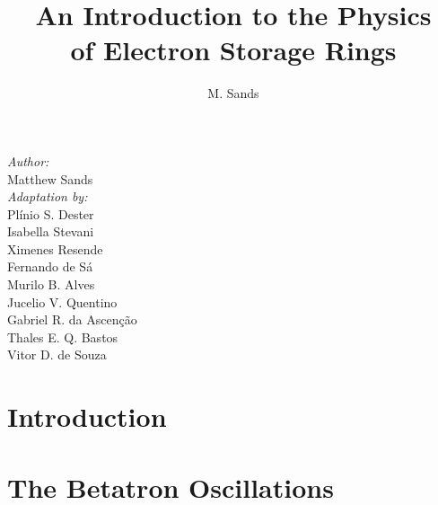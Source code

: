 \documentclass[ebook,a4paper,12pt,oneside,openany]{memoir}
\title{An Introduction to the Physics\\ of Electron Storage Rings}
\author{M. Sands}
\numberwithin{equation}{chapter}
\begin{document}
\maketitle
\vspace{30mm}
\begin{flushright}
    \textit{Author:} \\
    \vspace{1mm}
        Matthew Sands \\
    \vspace{5mm}
    \textit{Adaptation by:} \\
    \vspace{1mm}
	Pl\'inio S. Dester \\
	Isabella Stevani \\
	Ximenes Resende \\
  Fernando de S\'a \\
  Murilo B. Alves \\
    Jucelio V. Quentino \\
    Gabriel R. da Ascenção \\
    Thales E. Q. Bastos \\
    Vitor D. de Souza
\end{flushright}

\thispagestyle{empty}

\newpage
\tableofcontents

\newpage


\chapter{Introduction} \label{ch:1}
    
    
    

\chapter{The Betatron Oscillations} \label{ch:2}
    
    
    
    
    
    
    
    
    
    
    
    
\end{document}
